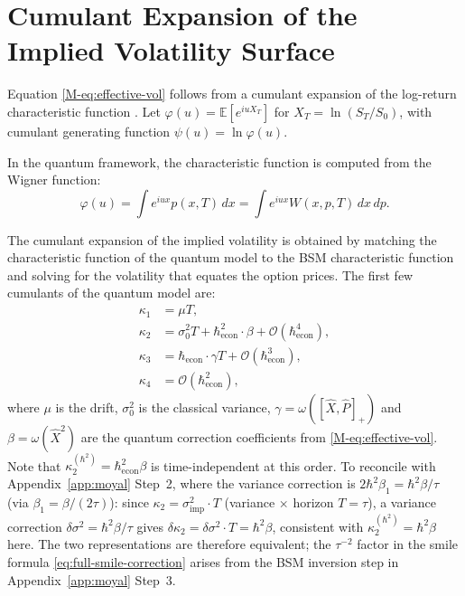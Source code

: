 
\section{Cumulant Expansion of the Implied Volatility Surface}\label{app:cumulants}

Equation \eqref{M-eq:effective-vol} follows from a cumulant expansion of the
log-return characteristic function
\citep{jarrow1982approximate,corrado1996skewness,backus2004accounting}. Let
$\varphi(u) = \mathbb{E}[e^{iu X_T}]$ for $X_T = \ln(S_T/S_0)$, with cumulant
generating function $\psi(u) = \ln \varphi(u)$.

In the quantum framework, the characteristic function is computed from the Wigner
function:
\begin{equation*}
    \varphi(u) = \int e^{iux} p(x, T) \, dx
    = \int e^{iux} W(x, p, T) \, dx \, dp.
\end{equation*}

The cumulant expansion of the implied volatility is obtained by matching the
characteristic function of the quantum model to the BSM characteristic function
and solving for the volatility that equates the option prices. The first few
cumulants of the quantum model are:
\begin{align}
    \kappa_1 &= \mu T, \label{eq:cumulant-1} \\
    \kappa_2 &= \sigma_0^2 T + \hbar_{\mathrm{econ}}^2 \cdot \beta
        + \mathcal{O}(\hbar_{\mathrm{econ}}^4), \label{eq:cumulant-2} \\
    \kappa_3 &= \hbar_{\mathrm{econ}} \cdot \gamma T
        + \mathcal{O}(\hbar_{\mathrm{econ}}^3), \label{eq:cumulant-3} \\
    \kappa_4 &= \mathcal{O}(\hbar_{\mathrm{econ}}^2), \label{eq:cumulant-4}
\end{align}
where $\mu$ is the drift, $\sigma_0^2$ is the classical variance,
$\gamma = \omega([\hat{X},\hat{P}]_+)$ and
$\beta = \omega(\hat{X}^2)$ are the quantum correction coefficients
from \eqref{M-eq:effective-vol}. Note that $\kappa_2^{(\hbar^2)} =
\hbar_{\mathrm{econ}}^2\beta$ is time-independent at this order.
To reconcile with Appendix~\ref{app:moyal} Step~2, where the variance
correction is $2\hbar^2\beta_1 = \hbar^2\beta/\tau$ (via $\beta_1=\beta/(2\tau)$):
since $\kappa_2 = \sigma^2_{\mathrm{imp}}\cdot T$ (variance $\times$ horizon $T=\tau$),
a variance correction $\delta\sigma^2 = \hbar^2\beta/\tau$ gives
$\delta\kappa_2 = \delta\sigma^2\cdot T = \hbar^2\beta$, consistent with
$\kappa_2^{(\hbar^2)} = \hbar^2\beta$ here. The two representations are
therefore equivalent; the $\tau^{-2}$ factor in the smile formula
\eqref{eq:full-smile-correction} arises from the BSM inversion step in
Appendix~\ref{app:moyal} Step~3.

